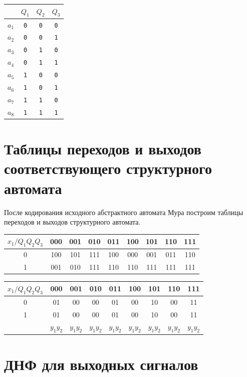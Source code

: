 \documentclass[12pt, a4paper]{article}
\begin{document}
\begin{tabular}{| c | c | c | c |}
  \hline
  & $Q_1$ & $Q_2$ & $Q_3$\\
  \hline
  $a_1$ & \texttt{0} & \texttt{0} & \texttt{0}\\
  $a_2$ & \texttt{0} & \texttt{0} & \texttt{1}\\
  $a_3$ & \texttt{0} & \texttt{1} & \texttt{0}\\
  $a_4$ & \texttt{0} & \texttt{1} & \texttt{1}\\
  $a_5$ & \texttt{1} & \texttt{0} & \texttt{0}\\
  $a_6$ & \texttt{1} & \texttt{0} & \texttt{1}\\
  $a_7$ & \texttt{1} & \texttt{1} & \texttt{0}\\
  $a_8$ & \texttt{1} & \texttt{1} & \texttt{1}\\
  \hline
\end{tabular}

\section*{Таблицы переходов и выходов соответствующего структурного автомата}

После кодирования исходного абстрактного автомата
Мура построим таблицы переходов и выходов структурного автомата.

\begin{tabular}{|*{9}{c|}}
  \hline
  $x_1/Q_1Q_2Q_3$ & 000 & 001 & 010 & 011 & 100 & 101 & 110 & 111\\\hline
  0 & 100 & 101 & 111 & 100 & 000 & 001 & 011 & 110\\\hline
  1 & 001 & 010 & 111 & 110 & 110 & 111 & 111 & 111\\\hline
\end{tabular}

\begin{tabular}{|*{9}{c|}}
  \hline
  $x_1/Q_1Q_2Q_3$ & 000 & 001 & 010 & 011 & 100 & 101 & 110 & 111\\\hline
  0 & 01 & 00 & 00 & 01 & 00 & 10 & 00 & 11\\\hline
  1 & 01 & 00 & 00 & 01 & 00 & 10 & 00 & 11\\\hline
   & $y_1y_2$ & $y_1y_2$ & $y_1y_2$ & $y_1y_2$ & $y_1y_2$ & $y_1y_2$ & $y_1y_2$ & $y_1y_2$\\\hline
\end{tabular}

\section*{ДНФ для выходных сигналов}
\end{document}
